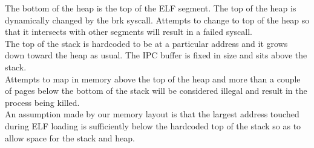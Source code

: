 \noindent
The bottom of the heap is the top of the ELF segment. The top of the heap
is dynamically changed by the brk syscall. Attempts to change to top of
the heap so that it intersects with other segments will result in a failed
syscall.
\\

\noindent
The top of the stack is hardcoded to be at a particular address and it
grows down toward the heap as usual. The IPC buffer is fixed in size
and sits above the stack.
\\

\noindent
Attempts to map in memory above the top of the heap and more than a couple
of pages below the bottom of the stack will be considered illegal and
result in the process being killed.
\\

\noindent
An assumption made by our memory layout is that the largest address
touched during ELF loading is sufficiently below the hardcoded top of
the stack so as to allow space for the stack and heap.

